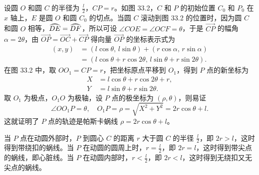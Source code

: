 设圆 $O$ 和圆 $C$ 的半径为 $\frac{l}{2}$，$CP=r$。如图 33.2，$C$ 和 $P$ 的初始位置 $C_0$ 和 $P_0$ 在 $x$ 轴上，$E$ 是圆 $O$ 和圆 $C_0$ 的切点。当圆 $C$ 滚动到图 33.2 的位置时，因为圆 $C$ 和圆 $O$ 相等，$\arc{DE}=\arc{DF}$，所以可设 $\angle COE=\angle OCF=\theta$，于是 $\overrightarrow{CP}$ 的幅角 $\alpha=2\theta$，由 $\overrightarrow{OP}=\overrightarrow{OC}+\overrightarrow{CP}$ 得向量 $\overrightarrow{OP}$ 的坐标表示式为
\begin{align*}
  (x, y) &= (l\cos\theta,\, l\sin\theta) + (r\cos\alpha,\, r\sin\alpha) \\
         &= (l\cos\theta + r\cos 2\theta,\, l\sin\theta + r\sin 2\theta).
\end{align*}
在图 33.2 中，取 $OO_1=CP=r$，把坐标原点平移到 $O_1$，得到 $P$ 点的新坐标为
\begin{align*}
  X &= l\cos\theta + r\cos 2\theta + r, \\
  Y &= l\sin\theta + r\sin 2\theta.
\end{align*}
取 $O_1$ 为极点，$O_1O$ 为极轴，设 $P$ 点的极坐标为 $(\rho, \theta)$，则易证
\[
  \angle OO_1P = \theta,\quad O_1P = \rho = \sqrt{X^2+Y^2} = 2r\cos\theta + l.
\]
这就证明了 $P$ 点的轨迹是帕斯卡蜗线 $\rho=2r\cos\theta+l$。

当 $P$ 点在动圆外部时，$P$ 到圆心 $C$ 的距离 $r$ 大于圆 $C$ 的半径 $\frac{l}{2}$，即 $2r>l$，这时得到带绕扣的蜗线。当 $P$ 在动圆的圆周上时，$r=\frac{l}{2}$，即 $2r=l$，这时得到带尖点的蜗线，即心脏线。当 $P$ 在动圆内部时，$r<\frac{l}{2}$，即 $2r<l$，这时得到无绕扣又无尖点的蜗线。
